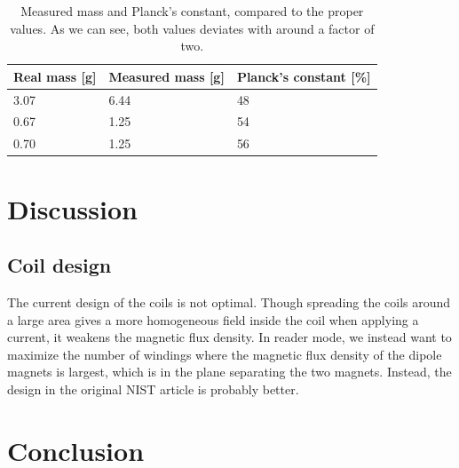 \documentclass[english,a4paper,12pt,reprint]{revtex4-1}
\begin{document}
\begin{table}[]
\centering
\caption{Measured mass and Planck's constant, compared to the proper values. As we can see, both values deviates with around a factor of two.}
\label{final_result}
\begin{tabular}{@{}lll@{}}
\toprule
Real mass {[}g{]} & Measured mass {[}g{]} & Planck's constant {[}\%{]} \\ \midrule
3.07              & 6.44                  & 48                                   \\
0.67              & 1.25                  & 54                                   \\
0.70              & 1.25                  & 56                                   \\ \bottomrule
\end{tabular}
\end{table}


\section{Discussion}

\subsection{Coil design}

The current design of the coils is not optimal. Though spreading the coils around a large area gives a more homogeneous field inside the coil when applying a current, it weakens the magnetic flux density. In reader mode, we instead want to maximize the number of windings where the magnetic flux density of the dipole magnets is largest, which is in the plane separating the two magnets. Instead, the design in the original NIST article \cite{chao_lego_2015} is probably better.

\section{Conclusion}
{}

\end{document}
